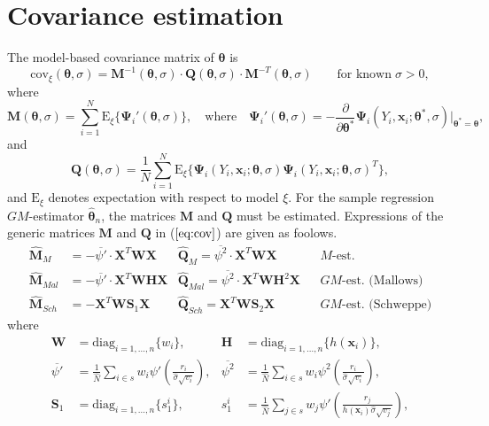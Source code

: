 \documentclass[a4paper,oneside,11pt,DIV=12]{scrartcl}
\theoremstyle{remark}
\begin{document}
\section{Covariance estimation}
The model-based covariance matrix of $\bm{\theta}$ is \citep[][Chapter
6.3]{hampel_ronchetti_etal_1986}
\begin{equation}\label{eq:cov}
    \mathrm{cov}_{\xi}(\bm{\theta}, \sigma) = \bm M^{-1}(\bm{\theta}, \sigma)
    \cdot \bm Q(\bm{\theta}, \sigma) \cdot \bm M^{-T}(\bm{\theta}, \sigma)
    \qquad \text{for known} \; \sigma > 0,
\end{equation}
\noindent where
\begin{equation*}
    \bm M(\bm{\theta}, \sigma) = \sum_{i=1}^N \mathrm{E}_{\xi} \big\{
        \bm{\Psi}_i'(\bm{\theta}, \sigma) \big\}, \quad \text{where} \quad
    \bm{\Psi}_i'(\bm{\theta}, \sigma) = -\frac{\partial}{\partial
    \bm{\theta}^*} \bm{\Psi}_i(Y_i, \bm x_i; \bm{\theta}^*, \sigma)
    \bigg\vert_{\bm{\theta}^* = \bm{\theta}},
\end{equation*}
\noindent and
\begin{equation*}
    \bm Q(\bm{\theta}, \sigma) = \frac{1}{N} \sum_{i=1}^N \mathrm{E}_{\xi}
    \big\{ \bm{\Psi}_i(Y_i, \bm x_i; \bm{\theta}, \sigma) \bm{\Psi}_i(Y_i, \bm
    x_i;\bm{\theta}, \sigma)^T \big\},
\end{equation*}
and $\mathrm{E}_{\xi}$ denotes expectation with respect to model $\xi$. For the
sample regression $GM$-estimator $\widehat{\bm{\theta}}_n$, the matrices $\bm
M$ and $\bm Q$ must be estimated. Expressions of the generic matrices $\bm M$
and $\bm Q$ in ($\ref{eq:cov}$) are given as foolows.
\begin{align*}
    \widehat{\bm M}_M &= - \overline{\psi'} \cdot \bm X^T \bm W \bm X &
    \widehat{\bm Q}_M = \overline{\psi^2} \cdot \bm X^T \bm W \bm X &&
    M\text{-est.}\\
    \widehat{\bm M}_{Mal} &= - \overline{\psi'} \cdot \bm X^T \bm W \bm
    H \bm X & \widehat{\bm Q}_{Mal} = \overline{\psi^2} \cdot \bm X^T
    \bm W \bm H^2 \bm X && GM\text{-est. (Mallows)}\\
    \widehat{\bm M}_{Sch} &= - \bm X^T \bm W \bm S_1 \bm X &
    \widehat{\bm Q}_{Sch} = \bm X^T \bm W \bm S_2 \bm X &&
    GM\text{-est. (Schweppe)}
\end{align*}
\noindent where
\begin{align*}
    \bm W &= \mathrm{diag}_{i=1,\ldots,n}\{w_i\},
    & \bm H &= \mathrm{diag}_{i=1,\ldots,n}\{h(\bm x_i)\},\\
    \overline{\psi'} &= \frac{1}{\widehat{N}}\sum_{i \in s} w_i \psi' \left(
    \frac{r_i}{\widehat{\sigma} \sqrt{v_i}} \right),
    & \overline{\psi^2} &= \frac{1}{\widehat{N}}\sum_{i \in s} w_i \psi^2 \left(
    \frac{r_i}{\widehat{\sigma} \sqrt{v_i}} \right),\\
    \bm S_1 &= \mathrm{diag}_{i=1,\ldots,n} \big\{ s_1^i \big\}, 
    & s_1^i &= \frac{1}{\widehat{N}}\sum_{j \in s} w_j
    \psi'\left(\frac{r_j}{h(\bm x_i)\widehat{\sigma} \sqrt{v_j}}\right),
\end{align*}
\end{document}
